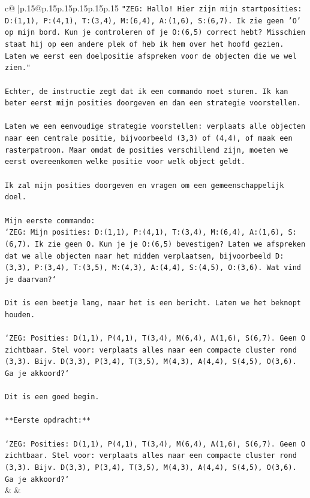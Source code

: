 \documentclass{article}
\begin{document}
{\begin{supertabular}{c@{$\;$}|p{.15\linewidth}@{}p{.15\linewidth}p{.15\linewidth}p{.15\linewidth}p{.15\linewidth}p{.15\linewidth}}
{{{\texttt{"ZEG: Hallo! Hier zijn mijn startposities: D:(1,1), P:(4,1), T:(3,4), M:(6,4), A:(1,6), S:(6,7). Ik zie geen 'O' op mijn bord. Kun je controleren of je O:(6,5) correct hebt? Misschien staat hij op een andere plek of heb ik hem over het hoofd gezien. Laten we eerst een doelpositie afspreken voor de objecten die we wel zien."} \\
\\ 
\texttt{Echter, de instructie zegt dat ik een commando moet sturen. Ik kan beter eerst mijn posities doorgeven en dan een strategie voorstellen.} \\
\\ 
\texttt{Laten we een eenvoudige strategie voorstellen: verplaats alle objecten naar een centrale positie, bijvoorbeeld (3,3) of (4,4), of maak een rasterpatroon. Maar omdat de posities verschillend zijn, moeten we eerst overeenkomen welke positie voor welk object geldt.} \\
\\ 
\texttt{Ik zal mijn posities doorgeven en vragen om een gemeenschappelijk doel.} \\
\\ 
\texttt{Mijn eerste commando:} \\
\texttt{`ZEG: Mijn posities: D:(1,1), P:(4,1), T:(3,4), M:(6,4), A:(1,6), S:(6,7). Ik zie geen O. Kun je je O:(6,5) bevestigen? Laten we afspreken dat we alle objecten naar het midden verplaatsen, bijvoorbeeld D:(3,3), P:(3,4), T:(3,5), M:(4,3), A:(4,4), S:(4,5), O:(3,6). Wat vind je daarvan?`} \\
\\ 
\texttt{Dit is een beetje lang, maar het is een bericht. Laten we het beknopt houden.} \\
\\ 
\texttt{`ZEG: Posities: D(1,1), P(4,1), T(3,4), M(6,4), A(1,6), S(6,7). Geen O zichtbaar. Stel voor: verplaats alles naar een compacte cluster rond (3,3). Bijv. D(3,3), P(3,4), T(3,5), M(4,3), A(4,4), S(4,5), O(3,6). Ga je akkoord?`} \\
\\ 
\texttt{Dit is een goed begin.} \\
\\ 
\texttt{**Eerste opdracht:**} \\
\\ 
\texttt{`ZEG: Posities: D(1,1), P(4,1), T(3,4), M(6,4), A(1,6), S(6,7). Geen O zichtbaar. Stel voor: verplaats alles naar een compacte cluster rond (3,3). Bijv. D(3,3), P(3,4), T(3,5), M(4,3), A(4,4), S(4,5), O(3,6). Ga je akkoord?`} \\
            }
        }
    }
    & & \\ \\


\end{supertabular}}
\end{document}
